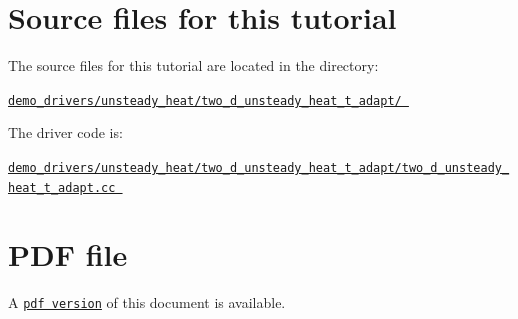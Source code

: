  

\hypertarget{index_sources}{}\section{Source files for this tutorial}\label{index_sources}

\begin{DoxyItemize}
\item The source files for this tutorial are located in the directory\+: \begin{center} \href{../../../../demo_drivers/unsteady_heat/two_d_unsteady_heat_t_adapt/}{\tt demo\+\_\+drivers/unsteady\+\_\+heat/two\+\_\+d\+\_\+unsteady\+\_\+heat\+\_\+t\+\_\+adapt/ } \end{center} 
\item The driver code is\+: \begin{center} \href{../../../../demo_drivers/unsteady_heat/two_d_unsteady_heat_t_adapt/two_d_unsteady_heat_t_adapt.cc}{\tt demo\+\_\+drivers/unsteady\+\_\+heat/two\+\_\+d\+\_\+unsteady\+\_\+heat\+\_\+t\+\_\+adapt/two\+\_\+d\+\_\+unsteady\+\_\+heat\+\_\+t\+\_\+adapt.\+cc } \end{center} 
\end{DoxyItemize}

 

 \hypertarget{index_pdf}{}\section{P\+D\+F file}\label{index_pdf}
A \href{../latex/refman.pdf}{\tt pdf version} of this document is available. 
